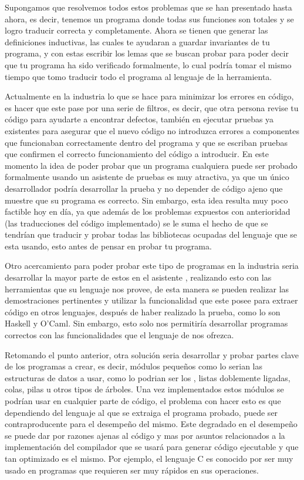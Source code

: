 Supongamos que resolvemos todos estos problemas que se han presentado hasta ahora, es decir,
tenemos un programa donde todas sus funciones son totales y se logro traducir correcta y
completamente. Ahora se tienen que generar las definiciones inductivas, las cuales te ayudaran a
guardar invariantes de tu programa, y con estas escribir los lemas que se buscan probar para poder
decir que tu programa ha sido verificado formalmente, lo cual podría tomar el mismo tiempo que tomo
traducir todo el programa al lenguaje de la herramienta.

Actualmente en la industria lo que se hace para minimizar los errores en c\'odigo, es hacer que este
pase por una serie de filtros, es decir, que otra persona revise tu c\'odigo para ayudarte a 
encontrar defectos, también en ejecutar pruebas ya existentes para asegurar que el nuevo c\'odigo no
introduzca errores a componentes que funcionaban correctamente dentro del programa y que se escriban 
pruebas que confirmen el correcto funcionamiento del c\'odigo a introducir. En este momento la idea 
de poder probar que un programa cualquiera puede ser probado formalmente usando un asistente de 
pruebas es muy atractiva, ya que un \'unico desarrollador podr\'ia desarrollar la prueba y no 
depender de código ajeno que muestre que su programa es correcto. Sin embargo, esta idea resulta muy 
poco factible hoy en día, ya que además de los problemas expuestos con anterioridad (las 
traducciones del c\'odigo implementado) se le suma el hecho de que se tendrían que traducir y probar 
todas las bibliotecas ocupadas del lenguaje que se esta usando, esto antes de pensar en probar tu 
programa.

Otro acercamiento para poder probar este tipo de programas en la industria seria desarrollar la 
mayor parte de estos en el asistente {\coq}, realizando esto con las herramientas que su lenguaje 
nos provee, de esta manera se pueden realizar las demostraciones pertinentes y utilizar la 
funcionalidad que este posee para extraer c\'odigo en otros lenguajes, después de haber realizado la 
prueba, como lo son Haskell y O'Caml. Sin embargo, esto solo nos permitiría desarrollar programas 
correctos con las funcionalidades que el lenguaje de {\coq} nos ofrezca.

Retomando el punto anterior, otra soluci\'on seria desarrollar y probar partes clave de los 
programas a crear, es decir, m\'odulos pequeños como lo serian las estructuras de datos a usar, como 
lo podrian ser los {\arns}, listas doblemente ligadas, colas, pilas u otros tipos de \'arboles. Una 
vez implementados estos m\'odulos se podrían usar en cualquier parte de c\'odigo, el problema con 
hacer esto es que dependiendo del lenguaje al que se extraiga el programa probado, puede ser 
contraproducente para el desempeño del mismo. Este degradado en el desempeño se puede dar por 
razones ajenas al c\'odigo y mas por asuntos relacionados a la implementaci\'on del compilador que 
se usar\'a para generar c\'odigo ejecutable y que tan optimizado es el mismo. Por ejemplo, el 
lenguaje C es conocido por ser muy usado en programas que requieren ser muy rápidos en sus 
operaciones.

